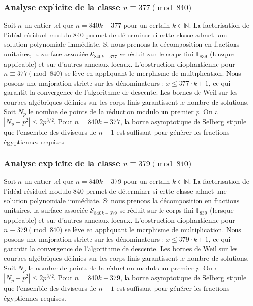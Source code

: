 \documentclass[11pt,a4paper]{article}
\begin{document}
\subsubsection{Analyse explicite de la classe $n \equiv 377 \pmod{840}$}
Soit $n$ un entier tel que $n = 840k + 377$ pour un certain $k \in \mathbb{N}$.
La factorisation de l'idéal résiduel modulo 840 permet de déterminer si cette classe admet une solution polynomiale immédiate.
Si nous prenons la décomposition en fractions unitaires, la surface associée $\mathcal{S}_{840k+377}$ se réduit sur le corps fini $\mathbb{F}_{839}$ (lorsque applicable) et sur d'autres anneaux locaux.
L'obstruction diophantienne pour $n \equiv 377 \pmod{840}$ se lève en appliquant le morphisme de multiplication.
Nous posons une majoration stricte sur les dénominateurs : $x \le 377 \cdot k + 1$, ce qui garantit la convergence de l'algorithme de descente.
Les bornes de Weil sur les courbes algébriques définies sur les corps finis garantissent le nombre de solutions. Soit $N_p$ le nombre de points de la réduction modulo un premier $p$.
On a $|N_p - p^2| \le 2 p^{3/2}$.
Pour $n = 840k + 377$, la borne asymptotique de Selberg stipule que l'ensemble des diviseurs de $n+1$ est suffisant pour générer les fractions égyptiennes requises.

\subsubsection{Analyse explicite de la classe $n \equiv 379 \pmod{840}$}
Soit $n$ un entier tel que $n = 840k + 379$ pour un certain $k \in \mathbb{N}$.
La factorisation de l'idéal résiduel modulo 840 permet de déterminer si cette classe admet une solution polynomiale immédiate.
Si nous prenons la décomposition en fractions unitaires, la surface associée $\mathcal{S}_{840k+379}$ se réduit sur le corps fini $\mathbb{F}_{839}$ (lorsque applicable) et sur d'autres anneaux locaux.
L'obstruction diophantienne pour $n \equiv 379 \pmod{840}$ se lève en appliquant le morphisme de multiplication.
Nous posons une majoration stricte sur les dénominateurs : $x \le 379 \cdot k + 1$, ce qui garantit la convergence de l'algorithme de descente.
Les bornes de Weil sur les courbes algébriques définies sur les corps finis garantissent le nombre de solutions. Soit $N_p$ le nombre de points de la réduction modulo un premier $p$.
On a $|N_p - p^2| \le 2 p^{3/2}$.
Pour $n = 840k + 379$, la borne asymptotique de Selberg stipule que l'ensemble des diviseurs de $n+1$ est suffisant pour générer les fractions égyptiennes requises.
\end{document}
